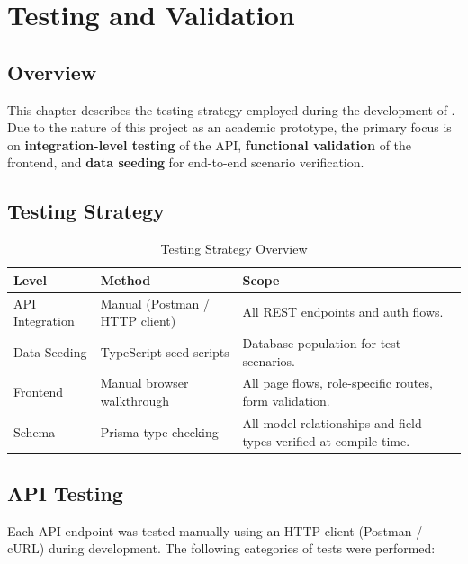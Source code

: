 ﻿%
\chapter{Testing and Validation}

\section{Overview}

This chapter describes the testing strategy employed during the development of \projectname{}. Due to the nature of this project as an academic prototype, the primary focus is on \textbf{integration-level testing} of the API, \textbf{functional validation} of the frontend, and \textbf{data seeding} for end-to-end scenario verification.

\section{Testing Strategy}

\begin{table}[H]
\centering
\caption{Testing Strategy Overview}
\begin{tabularx}{\textwidth}{llX}
\toprule
\textbf{Level} & \textbf{Method} & \textbf{Scope} \\
\midrule
API Integration  & Manual (Postman / HTTP client) & All REST endpoints and auth flows. \\
Data Seeding     & TypeScript seed scripts        & Database population for test scenarios. \\
Frontend         & Manual browser walkthrough     & All page flows, role-specific routes, form validation. \\
Schema           & Prisma type checking           & All model relationships and field types verified at compile time. \\
\bottomrule
\end{tabularx}
\end{table}

\section{API Testing}

Each API endpoint was tested manually using an HTTP client (Postman / cURL) during development. The following categories of tests were performed:

